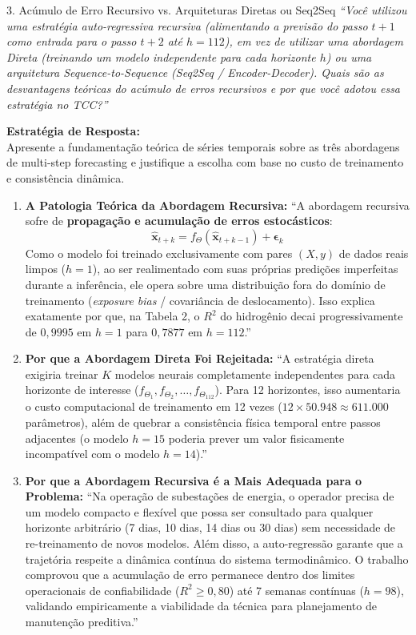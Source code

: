 \documentclass[11pt,a4paper]{article}
\begin{document}
\begin{boardQuestion}{3. Acúmulo de Erro Recursivo vs. Arquiteturas Diretas ou Seq2Seq}
\textit{“Você utilizou uma estratégia auto-regressiva recursiva (alimentando a previsão do passo $t+1$ como entrada para o passo $t+2$ até $h=112$), em vez de utilizar uma abordagem Direta (treinando um modelo independente para cada horizonte $h$) ou uma arquitetura Sequence-to-Sequence (Seq2Seq / Encoder-Decoder). Quais são as desvantagens teóricas do acúmulo de erros recursivos e por que você adotou essa estratégia no TCC?”}
\end{boardQuestion}

\begin{boardAnswer}
\textbf{Estratégia de Resposta:}\\
Apresente a fundamentação teórica de séries temporais sobre as três abordagens de multi-step forecasting e justifique a escolha com base no custo de treinamento e consistência dinâmica.

\begin{enumerate}[leftmargin=0.8cm]
  \item \textbf{A Patologia Teórica da Abordagem Recursiva:} ``A abordagem recursiva sofre de \textbf{propagação e acumulação de erros estocásticos}:
  \begin{equation}
    \hat{\mathbf{x}}_{t+k} = f_\Theta\left( \hat{\mathbf{x}}_{t+k-1} \right) + \boldsymbol{\epsilon}_k
  \end{equation}
  Como o modelo foi treinado exclusivamente com pares $(X, y)$ de dados reais limpos ($h=1$), ao ser realimentado com suas próprias predições imperfeitas durante a inferência, ele opera sobre uma distribuição fora do domínio de treinamento (\textit{exposure bias} / covariância de deslocamento). Isso explica exatamente por que, na Tabela 2, o $R^2$ do hidrogênio decai progressivamente de $0{,}9995$ em $h=1$ para $0{,}7877$ em $h=112$.''
  \item \textbf{Por que a Abordagem Direta Foi Rejeitada:} ``A estratégia direta exigiria treinar $K$ modelos neurais completamente independentes para cada horizonte de interesse ($f_{\Theta_1}, f_{\Theta_2}, \dots, f_{\Theta_{112}}$). Para 12 horizontes, isso aumentaria o custo computacional de treinamento em 12 vezes ($12 \times 50.948 \approx 611.000$ parâmetros), além de quebrar a consistência física temporal entre passos adjacentes (o modelo $h=15$ poderia prever um valor fisicamente incompatível com o modelo $h=14$).''
  \item \textbf{Por que a Abordagem Recursiva é a Mais Adequada para o Problema:} ``Na operação de subestações de energia, o operador precisa de um modelo compacto e flexível que possa ser consultado para qualquer horizonte arbitrário (7 dias, 10 dias, 14 dias ou 30 dias) sem necessidade de re-treinamento de novos modelos. Além disso, a auto-regressão garante que a trajetória respeite a dinâmica contínua do sistema termodinâmico. O trabalho comprovou que a acumulação de erro permanece dentro dos limites operacionais de confiabilidade ($R^2 \ge 0{,}80$) até 7 semanas contínuas ($h=98$), validando empiricamente a viabilidade da técnica para planejamento de manutenção preditiva.''
\end{enumerate}
\end{boardAnswer}
\end{document}
